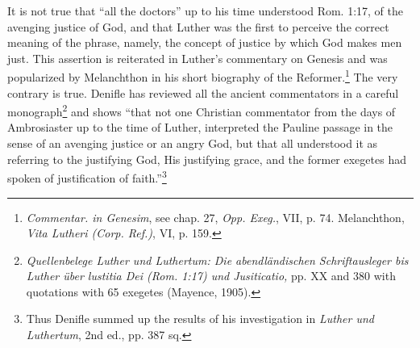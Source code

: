 It is not true that “all the doctors” up to his time understood Rom. 1:17,
of the avenging justice of God, and that Luther was the first
to perceive the correct meaning of the phrase, namely, the concept
of justice by which God makes men just. This assertion is reiterated
in Luther’s commentary on Genesis and was popularized by Melanchthon in
his short biography of the Reformer.\footnote
{\textit{Commentar. in Genesim}, see chap. 27, \textit{Opp. Exeg.}, VII, p. 74. Melanchthon, \textit{Vita
Lutheri (Corp. Ref.)}, VI, p. 159.}
The very contrary
is true. Denifle has reviewed all the ancient commentators in a
careful monograph\footnote
{\textit{Quellenbelege Luther und Luthertum: Die abendländischen Schriftausleger bis Luther
über lustitia Dei (Rom. 1:17) und Jusiticatio,} pp. XX and 380 with quotations with 65
exegetes (Mayence, 1905).}
 and shows “that not one Christian commentator
from the days of Ambrosiaster up to the time of Luther, interpreted
the Pauline passage in the sense of an avenging justice or an angry
God, but that all understood it as referring to the justifying God,
His justifying grace, and the former exegetes had spoken of justification
of faith.”\footnote
{Thus Denifle summed up the results of his investigation in \textit{Luther und Luthertum},
2nd ed., pp. 387 sq.}

